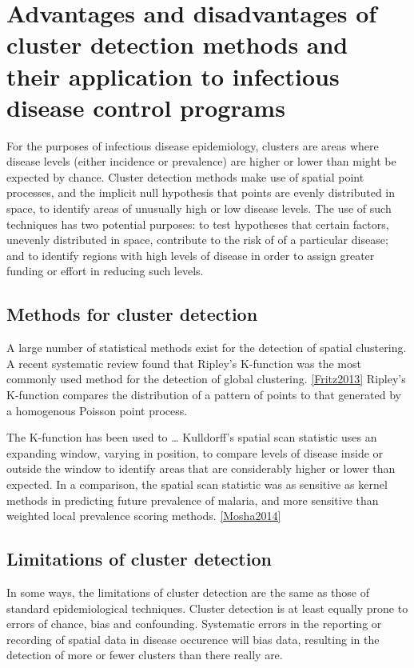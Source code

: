\documentclass[11pt,a4paper]{article}
\begin{document}
\section{Advantages and disadvantages of cluster detection methods and their application to infectious disease control programs}

For the purposes of infectious disease epidemiology, clusters are areas where disease levels (either incidence or prevalence) are higher or lower than might be expected by chance.
Cluster detection methods make use of spatial point processes, and the implicit null hypothesis that points are evenly distributed in space, to identify areas of unusually high or low disease levels.
The use of such techniques has two potential purposes: to test hypotheses that certain factors, unevenly distributed in space, contribute to the risk of of a particular disease; and to identify regions with high levels of disease in order to assign greater funding or effort in reducing such levels.

\subsection{Methods for cluster detection}
A large number of statistical methods exist for the detection of spatial clustering. 
A recent systematic review found that Ripley's K-function was the most commonly used method for the detection of global clustering. \ref{Fritz2013}
Ripley's K-function compares the distribution of a pattern of points to that generated by a homogenous Poisson point process. 

The K-function has been used to \ldots
Kulldorff's spatial scan statistic uses an expanding window, varying in position, to compare levels of disease inside or outside the window to identify areas that are considerably higher or lower than expected. 
In a comparison, the spatial scan statistic was as sensitive as kernel methods in predicting future prevalence of malaria, and more sensitive than weighted local prevalence scoring methods. \ref{Mosha2014}

\subsection{Limitations of cluster detection}
In some ways, the limitations of cluster detection are the same as those of standard epidemiological techniques. 
Cluster detection is at least equally prone to errors of chance, bias and confounding. 
Systematic errors in the reporting or recording of spatial data in disease occurence will bias data, resulting in the detection of more or fewer clusters than there really are. 
\end{document}
